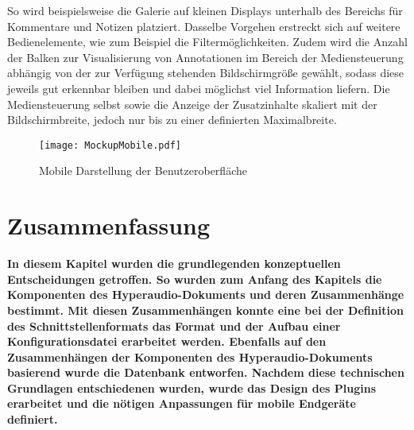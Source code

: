 So wird beispielsweise die Galerie auf kleinen Displays unterhalb des Bereichs für Kommentare und Notizen platziert. Dasselbe Vorgehen erstreckt sich auf weitere Bedienelemente, wie zum Beispiel die Filtermöglichkeiten. Zudem wird die Anzahl der Balken zur Visualisierung von Annotationen im Bereich der Mediensteuerung abhängig von der zur Verfügung stehenden Bildschirmgröße gewählt, sodass diese jeweils gut erkennbar bleiben und dabei möglichst viel Information liefern. Die Mediensteuerung selbst sowie die Anzeige der Zusatzinhalte skaliert mit der Bildschirmbreite, jedoch nur bis zu einer definierten Maximalbreite.

\begin{figure}[h!]
\texttt{[image: MockupMobile.pdf]}
\caption{\label{fig:MockupMobile} Mobile Darstellung der Benutzeroberfläche}
\end{figure}

\section{Zusammenfassung}
\textbf{In diesem Kapitel wurden die grundlegenden konzeptuellen Entscheidungen getroffen. So wurden zum Anfang des Kapitels die Komponenten des Hyperaudio-Dokuments und deren Zusammenhänge bestimmt. Mit diesen Zusammenhängen konnte eine bei der Definition des Schnittstellenformats das Format und der Aufbau einer Konfigurationsdatei erarbeitet werden. Ebenfalls auf den Zusammenhängen der Komponenten des Hyperaudio-Dokuments basierend wurde die Datenbank entworfen. Nachdem diese technischen Grundlagen entschiedenen wurden, wurde das Design des Plugins erarbeitet und die nötigen Anpassungen für mobile Endgeräte definiert.}

